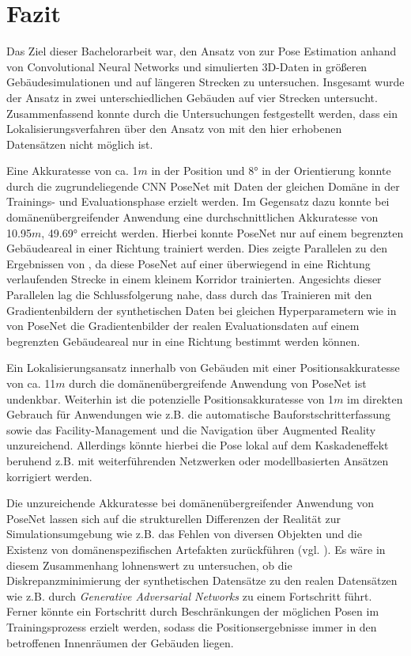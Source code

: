 
\section{Fazit}
\label{sec:kapitel_6}
Das Ziel dieser Bachelorarbeit war, den Ansatz von \citet{acharyaBIMPoseNetIndoorCamera2019} zur Pose Estimation anhand von Convolutional Neural Networks und simulierten 3D-Daten in größeren Gebäudesimulationen und auf längeren Strecken zu untersuchen.
Insgesamt wurde der Ansatz in zwei unterschiedlichen Gebäuden auf vier Strecken untersucht. Zusammenfassend konnte durch die Untersuchungen festgestellt werden, dass ein Lokalisierungsverfahren über den Ansatz von \citet{acharyaBIMPoseNetIndoorCamera2019} mit den hier erhobenen Datensätzen nicht möglich ist.


Eine Akkuratesse von ca. 1$m$ in der Position und 8° in der Orientierung konnte durch die zugrundeliegende CNN PoseNet mit Daten der gleichen Domäne in der Trainings- und Evaluationsphase erzielt werden. Im Gegensatz dazu konnte bei domänenübergreifender Anwendung eine durchschnittlichen Akkuratesse von 10.95$m$, 49.69° erreicht werden. Hierbei konnte PoseNet nur auf einem begrenzten Gebäudeareal in einer Richtung trainiert werden. Dies zeigte Parallelen zu den Ergebnissen von \citet{acharyaBIMPoseNetIndoorCamera2019}, da diese PoseNet auf einer überwiegend in eine Richtung verlaufenden Strecke in einem kleinem Korridor trainierten. Angesichts dieser Parallelen lag die Schlussfolgerung nahe, dass durch das Trainieren mit den Gradientenbildern der synthetischen Daten bei gleichen Hyperparametern wie in \cite{acharyaBIMPoseNetIndoorCamera2019} von PoseNet die Gradientenbilder der realen Evaluationsdaten auf einem begrenzten Gebäudeareal nur in eine Richtung bestimmt werden können.

Ein Lokalisierungsansatz innerhalb von Gebäuden mit einer Positionsakkuratesse von ca. 11$m$ durch die domänenübergreifende Anwendung von PoseNet ist undenkbar. Weiterhin ist die potenzielle Positionsakkuratesse von 1$m$ im direkten Gebrauch für Anwendungen wie z.B. die automatische Bauforstschritterfassung sowie das Facility-Manage\-ment und die Navigation über Augmented Reality unzureichend. Allerdings könnte hierbei die Pose lokal auf dem Kaskadeneffekt beruhend z.B. mit weiterführenden Netzwerken oder modellbasierten Ansätzen korrigiert werden.

Die unzureichende Akkuratesse bei domänenübergreifender Anwendung von PoseNet lassen sich auf die strukturellen Differenzen der Realität zur Simulationsumgebung wie z.B. das Fehlen von diversen Objekten und die Existenz von domänenspezifischen Artefakten zurückführen (vgl. \cite{acharyaBIMPoseNetIndoorCamera2019}). Es wäre in diesem Zusammenhang lohnenswert zu untersuchen, ob die Diskrepanzminimierung der synthetischen Datensätze zu den realen Datensätzen wie z.B. durch \textit{Generative Adversarial Networks} zu einem Fortschritt führt. Ferner könnte ein Fortschritt durch Beschränkungen der möglichen Posen im Trainingsprozess erzielt werden, sodass die Positionsergebnisse immer in den betroffenen Innenräumen der Gebäuden liegen.
